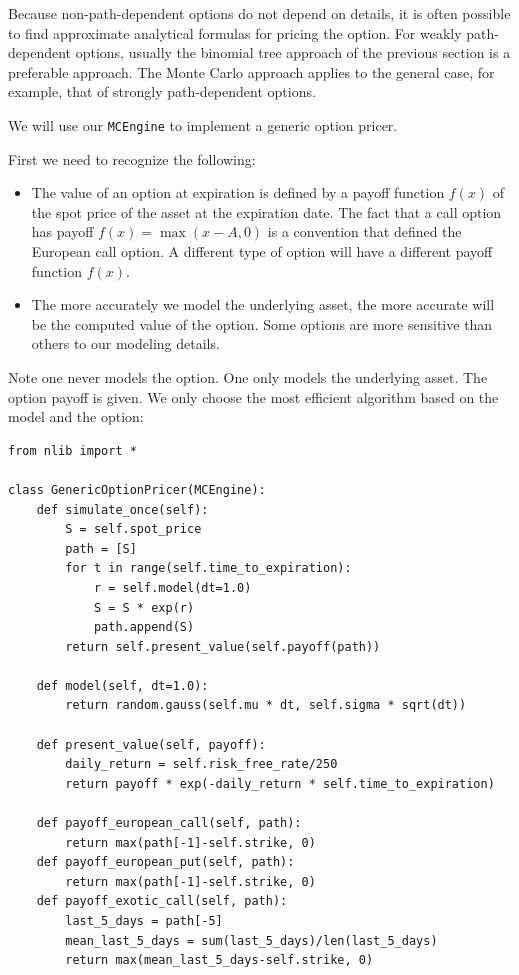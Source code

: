 \documentclass[justified, sixbynine]{tufte-book}
\def\ft{\small\tt}
\theoremstyle{plain}%
\newtheorem * {corollary}{Corollary}
\theoremstyle{definition}
\theoremstyle{remark}
\newtheorem * {remark}{Remark}
\newtheorem * {note}{Note}
\begin{document}
\begin{fullwidth}
 Because non-path-dependent options do not depend on details, it is often possible to find approximate analytical formulas for pricing the option. For weakly path-dependent options, usually the binomial tree approach of the previous section is a preferable approach. The Monte Carlo approach applies to the general case, for example, that of strongly path-dependent options.

We will use our {\ft MCEngine} to implement a generic option pricer.

First we need to recognize the following:

\begin{itemize}
\item  The value of an option at expiration is defined by a payoff function
$f(x)$ of the spot price of the asset at the expiration date. The fact that
a call option has payoff $f(x)=\max (x-A, 0)$ is a convention that defined the European call option.
A different type of option will have a different payoff function $f(x)$.

\item  The more accurately we model the underlying asset, the more accurate will be the computed value of the option. Some options are more sensitive than others to our modeling details.
\end{itemize}

Note one never models the option. One only models the underlying asset. The option payoff is given. We only choose the most efficient algorithm based on the model and the option:

\begin{lstlisting}[caption={in file: {\ft options.py}}]
from nlib import * 

class GenericOptionPricer(MCEngine):
    def simulate_once(self):
        S = self.spot_price
        path = [S]
        for t in range(self.time_to_expiration):
            r = self.model(dt=1.0)
            S = S * exp(r)
            path.append(S)
        return self.present_value(self.payoff(path))

    def model(self, dt=1.0):
        return random.gauss(self.mu * dt, self.sigma * sqrt(dt))

    def present_value(self, payoff):
        daily_return = self.risk_free_rate/250
        return payoff * exp(-daily_return * self.time_to_expiration)

    def payoff_european_call(self, path):
        return max(path[-1]-self.strike, 0)
    def payoff_european_put(self, path):
        return max(path[-1]-self.strike, 0)
    def payoff_exotic_call(self, path):
        last_5_days = path[-5]
        mean_last_5_days = sum(last_5_days)/len(last_5_days)
        return max(mean_last_5_days-self.strike, 0)


\end{lstlisting}
\end{fullwidth}
\end{document}
